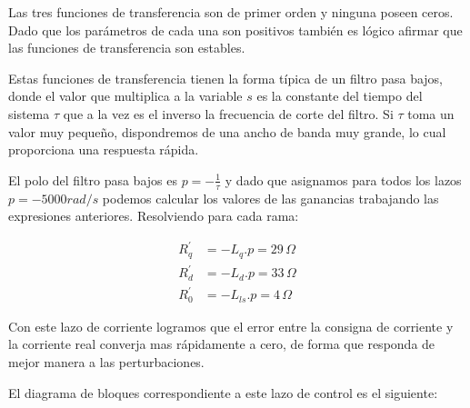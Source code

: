 \documentclass{article}
\begin{document}
Las tres funciones de transferencia son de primer orden y ninguna poseen ceros. Dado que
los parámetros de cada una son positivos también es lógico afirmar que las funciones de 
transferencia son estables.

Estas funciones de transferencia tienen la forma típica de un filtro pasa bajos, donde el valor que
multiplica a la variable $s$ es la constante del tiempo del sistema $\tau$ que a la vez es el inverso
la frecuencia de corte del filtro. Si $\tau$ toma un valor muy pequeño, dispondremos de una ancho de 
banda muy grande, lo cual proporciona una respuesta rápida.

El polo del filtro pasa bajos es $p = -\frac{1}{\tau}$ y dado que asignamos para todos los lazos $p = -5000 rad/s$
podemos calcular los valores de las ganancias trabajando las expresiones anteriores.
Resolviendo para cada rama:

\begin{align*}
    R_q^\prime &= -L_q.p = 29\,\Omega  \\
    R_d^\prime &= -L_d.p = 33\,\Omega \\
    R_0^\prime &= -L_{ls}.p = 4\,\Omega
\end{align*}

Con este lazo de corriente logramos que el error entre la consigna de corriente y la corriente real
converja mas rápidamente a cero, de forma que responda de mejor manera a las perturbaciones.

El diagrama de bloques correspondiente a este lazo de control es el siguiente:
\end{document}
